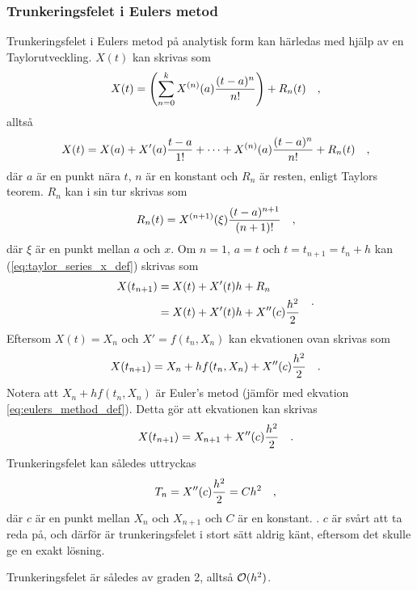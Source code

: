 \subsubsection{Trunkeringsfelet i Eulers metod}
Trunkeringsfelet i Eulers metod på analytisk form kan härledas med hjälp av en Taylorutveckling. \(X(t)\) kan skrivas som
\begin{equation}\label{eq:taylor_series_x_def}
    X(t)=\left(\sum_{n=0}^k X^{(n)}(a)\frac{(t-a)^n}{n!}\right)+R_{n}(t)
\quad\mathrm{,}\!\!\!\!\!\!\end{equation} alltså
\begin{equation}
    X(t)=X(a)+X'(a)\frac{t-a}{1!}+\cdots+X^{(n)}(a)\frac{(t-a)^n}{n!}+R_{n}(t)
\quad\mathrm{,}\!\!\!\!\!\!\end{equation} där \(a\) är en punkt nära \(t\), \(n\) är en konstant och \(R_{n}\) är resten, enligt Taylors teorem. \(R_n\) kan i sin tur skrivas som
\begin{equation}
    R_{n}(t)=X^{(n+1)}(\xi)\frac{(t-a)^{n+1}}{(n+1)!}
\quad\mathrm{,}\!\!\!\!\!\!\end{equation} där \(\xi\) är en punkt mellan \(a\) och \(x\). Om \(n=1\), \(a=t\) och \(t=t_{n+1}=t_n+h\) kan (\ref{eq:taylor_series_x_def}) skrivas som
\begin{equation}
    \begin{split}
        X(t_{n+1})&=X(t)+X'(t)h+R_{n}\\
        &=X(t)+X'(t)h+X''(c)\frac{h^2}{2}
    \end{split}
\quad\mathrm{.}\!\!\!\!\!\!\end{equation} Eftersom \(X(t)=X_n\) och \(X'=f(t_n, X_n)\) kan ekvationen ovan skrivas som
\begin{equation}
    X(t_{n+1})=X_n+hf(t_n, X_n)+X''(c)\frac{h^2}{2}
\quad\mathrm{.}\!\!\!\!\!\!\end{equation} Notera att \(X_n+hf(t_n, X_n)\) är Euler's metod (jämför med ekvation \ref{eq:eulers_method_def}). Detta gör att ekvationen kan skrivas
\begin{equation}
    X(t_{n+1})=X_{n+1}+X''(c)\frac{h^2}{2}
\quad\mathrm{.}\!\!\!\!\!\!\end{equation} Trunkeringsfelet kan således uttryckas
\begin{equation}
    T_n=X''(c)\frac{h^2}{2}=Ch^2
\quad\mathrm{,}\!\!\!\!\!\!\end{equation} där \(c\) är en punkt mellan \(X_n\) och \(X_{n+1}\) och \(C\) är en konstant. \parencite[369]{zill_differential_2005}. \(c\) är svårt att ta reda på, och därför är trunkeringsfelet i stort sätt aldrig känt, eftersom det skulle ge en exakt lösning.

Trunkeringsfelet är således av graden 2, alltså \(\mathcal{O}(h^2)\).

